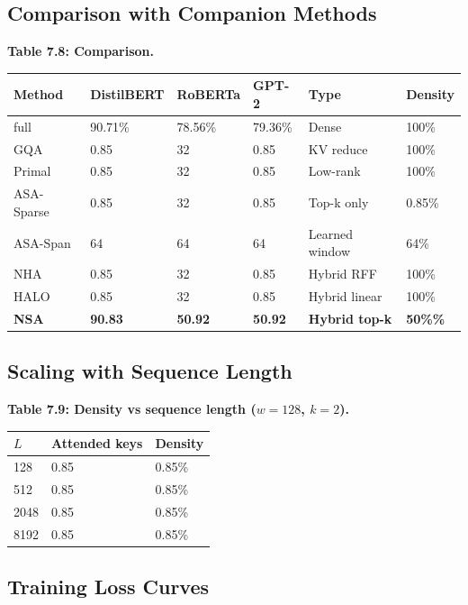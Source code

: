 \subsection{Comparison with Companion Methods}

\textbf{Table 7.8: Comparison.}

\begin{table}[H]
\centering
\small
\begin{tabular}{llllll}
\toprule
\textbf{Method} & \textbf{DistilBERT} & \textbf{RoBERTa} & \textbf{GPT-2} & \textbf{Type} & \textbf{Density} \\
\midrule
full & 90.71\% & 78.56\% & 79.36\% & Dense & 100\% \\
GQA & 0.85 & 32 & 0.85 & KV reduce & 100\% \\
Primal & 0.85 & 32 & 0.85 & Low-rank & 100\% \\
ASA-Sparse & 0.85 & 32 & 0.85 & Top-k only & 0.85\% \\
ASA-Span & 64 & 64 & 64 & Learned window & 64\% \\
NHA & 0.85 & 32 & 0.85 & Hybrid RFF & 100\% \\
HALO & 0.85 & 32 & 0.85 & Hybrid linear & 100\% \\
\textbf{NSA} & \textbf{90.83} & \textbf{50.92} & \textbf{50.92} & \textbf{Hybrid top-k} & \textbf{50\%\%} \\
\bottomrule
\end{tabular}
\end{table}

\subsection{Scaling with Sequence Length}

\textbf{Table 7.9: Density vs sequence length ($w = 128$, $k = 2$).}

\begin{table}[H]
\centering
\small
\begin{tabular}{lll}
\toprule
\textbf{$L$} & \textbf{Attended keys} & \textbf{Density} \\
\midrule
128 & 0.85 & 0.85\% \\
512 & 0.85 & 0.85\% \\
2048 & 0.85 & 0.85\% \\
8192 & 0.85 & 0.85\% \\
\bottomrule
\end{tabular}
\end{table}

\subsection{Training Loss Curves}

